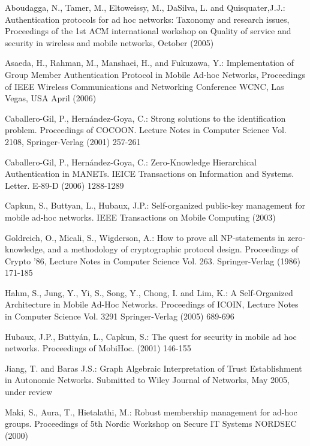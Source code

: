 \documentclass[conference]{IEEEtran}
\begin{document}
\begin{thebibliography}{10}

Aboudagga, N., Tamer, M., Eltoweissy, M.,  DaSilva, L. and  Quisquater,J.J.:
Authentication protocols for ad hoc networks: Taxonomy and
research issues, Proceedings of the 1st ACM international workshop
on Quality of service and security in wireless and mobile
networks, October (2005)

Asaeda, H.,  Rahman, M., Manshaei, H., and Fukuzawa, Y.:
Implementation of Group Member Authentication Protocol in Mobile
Ad-hoc Networks, Proceedings of IEEE Wireless Communications and
Networking Conference WCNC, Las Vegas, USA April (2006)

Caballero-Gil, P., Hern{\'a}ndez-Goya, C.: Strong solutions to the
identification problem. Proceedings of COCOON. Lecture Notes in
Computer
  Science Vol. 2108, Springer-Verlag (2001) 257-261


 Caballero-Gil, P., Hern\'andez-Goya, C.: Zero-Knowledge Hierarchical Authentication in MANETs.
IEICE Transactions on Information and Systems. Letter. E-89-D
(2006) 1288-1289

Capkun, S., Buttyan, L., Hubaux, J.P.: Self-organized public-key
management for mobile ad-hoc networks. IEEE Transactions on Mobile
Computing (2003)

Goldreich, O., Micali, S., Wigderson, A.: How to prove all
{NP}-statements in zero-knowledge, and a methodology
  of cryptographic protocol design.
Proceedings of Crypto '86, Lecture Notes in Computer Science Vol.
263.
  Springer-Verlag (1986)  171-185

 Hahm, S., Jung, Y.,
Yi, S., Song, Y., Chong, I. and Lim, K.: A Self-Organized
Architecture in Mobile Ad-Hoc Networks. Proceedings of ICOIN,
Lecture Notes in Computer Science Vol.  3291
  Springer-Verlag (2005)  689-696

Hubaux, J.P., Butty{\'a}n, L., Capkun, S.: The quest for security
in mobile ad hoc networks. Proceedings of MobiHoc. (2001)  146-155

 Jiang, T. and Baras J.S.: Graph Algebraic Interpretation of Trust Establishment in Autonomic Networks.
Submitted to Wiley Journal of Networks, May 2005, under review

Maki, S., Aura, T., Hietalathi, M.: Robust membership management
for ad-hoc groups. Proceedings of 5th Nordic Workshop on Secure IT
Systems NORDSEC (2000)


\end{thebibliography}
\end{document}
